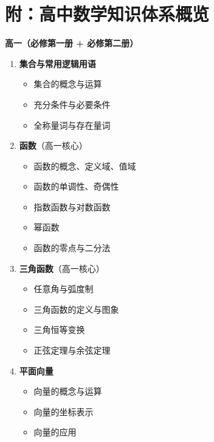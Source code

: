 \documentclass[12pt, a4paper]{ctexart}
\begin{document}
\newpage
\section*{\textcolor{mainblue}{附：高中数学知识体系概览}}

\begin{knowledgebox}

\textbf{高一（必修第一册 + 必修第二册）}
\begin{enumerate}[label=\textbf{\arabic*.}, leftmargin=2.5em]
  \item \textbf{集合与常用逻辑用语}
    \begin{itemize}
      \item 集合的概念与运算
      \item 充分条件与必要条件
      \item 全称量词与存在量词
    \end{itemize}
  \item \textbf{函数}（高一核心）
    \begin{itemize}
      \item 函数的概念、定义域、值域
      \item 函数的单调性、奇偶性
      \item 指数函数与对数函数
      \item 幂函数
      \item 函数的零点与二分法
    \end{itemize}
  \item \textbf{三角函数}（高一核心）
    \begin{itemize}
      \item 任意角与弧度制
      \item 三角函数的定义与图象
      \item 三角恒等变换
      \item 正弦定理与余弦定理
    \end{itemize}
  \item \textbf{平面向量}
    \begin{itemize}
      \item 向量的概念与运算
      \item 向量的坐标表示
      \item 向量的应用
    \end{itemize}
\end{enumerate}


\end{knowledgebox}
\end{document}
